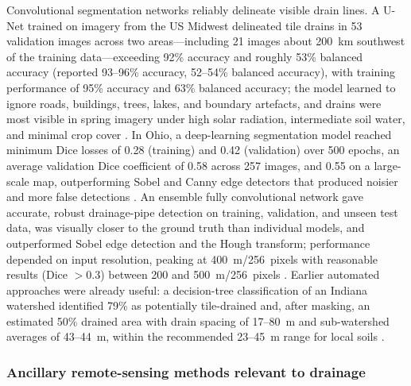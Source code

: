 Convolutional segmentation networks reliably delineate visible drain lines. A
U-Net trained on imagery from the US Midwest delineated tile drains in 53
validation images across two areas---including 21 images about 200~km southwest
of the training data---exceeding 92\% accuracy and roughly 53\% balanced
accuracy (reported 93--96\% accuracy, 52--54\% balanced accuracy), with training
performance of 95\% accuracy and 63\% balanced accuracy; the model learned to
ignore roads, buildings, trees, lakes, and boundary artefacts, and drains were
most visible in spring imagery under high solar radiation, intermediate soil
water, and minimal crop cover \parencite{Redoloza2023}. In Ohio, a
deep-learning segmentation model reached minimum Dice losses of 0.28 (training)
and 0.42 (validation) over 500 epochs, an average validation Dice coefficient of
0.58 across 257 images, and 0.55 on a large-scale map, outperforming Sobel and
Canny edge detectors that produced noisier and more false detections
\parencite{Song2021}. An ensemble fully convolutional network gave accurate,
robust drainage-pipe detection on training, validation, and unseen test data,
was visually closer to the ground truth than individual models, and outperformed
Sobel edge detection and the Hough transform; performance depended on input
resolution, peaking at 400~m/256~pixels with reasonable results (Dice $>0.3$)
between 200 and 500~m/256~pixels \parencite{Woo2023}. Earlier automated
approaches were already useful: a decision-tree classification of an Indiana
watershed identified 79\% as potentially tile-drained and, after masking, an
estimated 50\% drained area with drain spacing of 17--80~m and sub-watershed
averages of 43--44~m, within the recommended 23--45~m range for local soils
\parencite{Naz2009}.

\subsubsection{Ancillary remote-sensing methods relevant to drainage}

